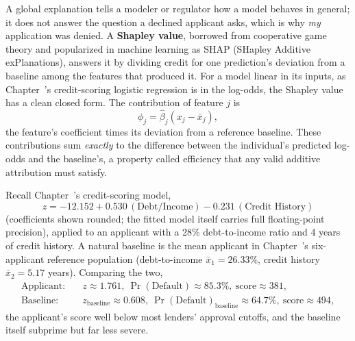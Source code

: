 \documentclass[../ai_in_finance]{subfiles}
\begin{document}
A global explanation tells a modeler or regulator how a model behaves in general; it does not answer the question a declined applicant asks, which is why \emph{my} application was denied. A \textbf{Shapley value}, borrowed from cooperative game theory \parencite{shapley1953value} and popularized in machine learning as SHAP (SHapley Additive exPlanations), answers it by dividing credit for one prediction's deviation from a baseline among the features that produced it. For a model linear in its inputs, as Chapter~'s credit-scoring logistic regression is in the log-odds, the Shapley value has a clean closed form. The contribution of feature $j$ is
\begin{equation}
\phi_j = \hat\beta_j (x_j - \bar x_j),
\label{eq:xai-shapley-linear}
\end{equation}
the feature's coefficient times its deviation from a reference baseline. These contributions sum \emph{exactly} to the difference between the individual's predicted log-odds and the baseline's, a property called efficiency that any valid additive attribution must satisfy.

Recall Chapter~'s credit-scoring model,
$$z = -12.152 + 0.530\,(\text{Debt/Income}) - 0.231\,(\text{Credit History})$$
(coefficients shown rounded; the fitted model itself carries full floating-point precision), applied to an applicant with a 28\% debt-to-income ratio and 4 years of credit history. A natural baseline is the mean applicant in Chapter~'s six-applicant reference population (debt-to-income $\bar x_1 = 26.33\%$, credit history $\bar x_2 = 5.17$ years). Comparing the two,
\begin{align*}
\text{Applicant:} &\quad z \approx 1.761, \ \Pr(\text{Default}) \approx 85.3\%, \ \text{score} \approx 381, \\
\text{Baseline:} &\quad z_{\text{baseline}} \approx 0.608, \ \Pr(\text{Default})_{\text{baseline}} \approx 64.7\%, \ \text{score} \approx 494,
\end{align*}
the applicant's score well below most lenders' approval cutoffs, and the baseline itself subprime but far less severe.
\end{document}
